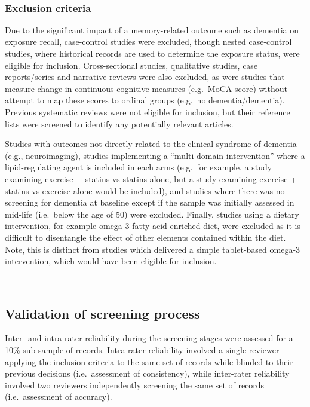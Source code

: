 \documentclass[a4paper, twoside]{templates/ociamthesis}
\begin{document}
~

\hypertarget{exclusion-criteria}{%
\subsubsection{Exclusion criteria}\label{exclusion-criteria}}

Due to the significant impact of a memory-related outcome such as dementia on exposure recall, case-control studies were excluded, though nested case-control studies, where historical records are used to determine the exposure status, were eligible for inclusion. Cross-sectional studies, qualitative studies, case reports/series and narrative reviews were also excluded, as were studies that measure change in continuous cognitive measures (e.g.~MoCA score) without attempt to map these scores to ordinal groups (e.g.~no dementia/dementia). Previous systematic reviews were not eligible for inclusion, but their reference lists were screened to identify any potentially relevant articles.

Studies with outcomes not directly related to the clinical syndrome of dementia (e.g., neuroimaging), studies implementing a ``multi-domain intervention'' where a lipid-regulating agent is included in each arms (e.g.~for example, a study examining exercise + statins vs statins alone, but a study examining exercise + statins vs exercise alone would be included), and studies where there was no screening for dementia at baseline except if the sample was initially assessed in mid-life (i.e.~below the age of 50) were excluded. Finally, studies using a dietary intervention, for example omega-3 fatty acid enriched diet, were excluded as it is difficult to disentangle the effect of other elements contained within the diet. Note, this is distinct from studies which delivered a simple tablet-based omega-3 intervention, which would have been eligible for inclusion.

~

\hypertarget{validation-of-screening-process}{%
\subsection{Validation of screening process}\label{validation-of-screening-process}}

Inter- and intra-rater reliability during the screening stages were assessed for a 10\% sub-sample of records. Intra-rater reliability involved a single reviewer applying the inclusion criteria to the same set of records while blinded to their previous decisions (i.e.~assessment of consistency), while inter-rater reliability involved two reviewers independently screening the same set of records (i.e.~assessment of accuracy).
\end{document}
